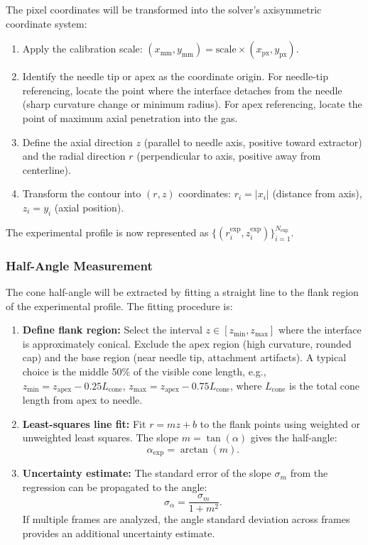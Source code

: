 The pixel coordinates will be transformed into the solver's axisymmetric coordinate system:
\begin{enumerate}
    \item Apply the calibration scale: $(x_{\text{mm}}, y_{\text{mm}}) = \text{scale} \times (x_{\text{px}}, y_{\text{px}})$.
    \item Identify the needle tip or apex as the coordinate origin. For needle-tip referencing, locate the point where the interface detaches from the needle (sharp curvature change or minimum radius). For apex referencing, locate the point of maximum axial penetration into the gas.
    \item Define the axial direction $z$ (parallel to needle axis, positive toward extractor) and the radial direction $r$ (perpendicular to axis, positive away from centerline).
    \item Transform the contour into $(r, z)$ coordinates: $r_i = |x_i|$ (distance from axis), $z_i = y_i$ (axial position).
\end{enumerate}

The experimental profile is now represented as $\{(r_i^{\exp}, z_i^{\exp})\}_{i=1}^{N_{\exp}}$.

\subsubsection{Half-Angle Measurement}

The cone half-angle will be extracted by fitting a straight line to the flank region of the experimental profile. The fitting procedure is:
\begin{enumerate}
    \item \textbf{Define flank region:} Select the interval $z \in [z_{\min}, z_{\max}]$ where the interface is approximately conical. Exclude the apex region (high curvature, rounded cap) and the base region (near needle tip, attachment artifacts). A typical choice is the middle 50\% of the visible cone length, e.g., $z_{\min} = z_{\text{apex}} - 0.25 L_{\text{cone}}$, $z_{\max} = z_{\text{apex}} - 0.75 L_{\text{cone}}$, where $L_{\text{cone}}$ is the total cone length from apex to needle.
    \item \textbf{Least-squares line fit:} Fit $r = m z + b$ to the flank points using weighted or unweighted least squares. The slope $m = \tan(\alpha)$ gives the half-angle:
    \begin{equation}
    \alpha_{\exp} = \arctan(m).
    \end{equation}
    \item \textbf{Uncertainty estimate:} The standard error of the slope $\sigma_m$ from the regression can be propagated to the angle:
    \begin{equation}
    \sigma_{\alpha} = \frac{\sigma_m}{1 + m^2}.
    \end{equation}
    If multiple frames are analyzed, the angle standard deviation across frames provides an additional uncertainty estimate.
\end{enumerate}

